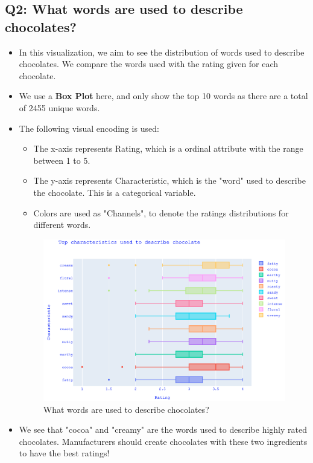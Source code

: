 \documentclass[a4paper]{article}
\begin{document}
\subsection{Q2: What words are used to describe chocolates?}
\begin{itemize}
    \item In this visualization, we aim to see the distribution of words used to describe chocolates. We compare the words used with the rating given for each chocolate.
    \item We use a \textbf{Box Plot} here, and only show the top 10 words as there are a total of 2455 unique words.
    \item The following visual encoding is used:
    \begin{itemize}
        \item The x-axis represents Rating, which is a ordinal attribute with the range between 1 to 5. 
        \item The y-axis represents Characteristic, which is the "word" used to describe the chocolate. This is a categorical variable.
        \item Colors are used as "Channels", to denote the ratings distributions for different words.
    \end{itemize}
    \begin{figure}[H]
        \centering
        \includegraphics[width=1.0\textwidth]{box}
        \caption{What words are used to describe chocolates?}
        \label{fig:box}
    \end{figure}
    \item We see that "cocoa" and "creamy" are the words used to describe highly rated chocolates. Manufacturers should create chocolates with these two ingredients to have the best ratings!
\end{itemize}
\end{document}
